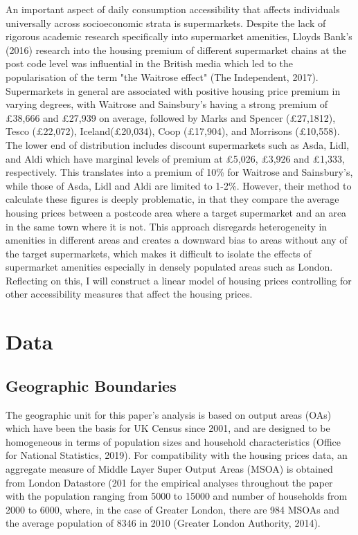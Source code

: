 \documentclass{article}
\begin{document}
An important aspect of daily consumption accessibility that affects individuals universally across socioeconomic strata is supermarkets. Despite the lack of rigorous academic research specifically into supermarket amenities, Lloyds Bank's (2016) research into the housing premium of different supermarket chains at the post code level was influential in the British media which led to the popularisation of the term "the Waitrose effect" (The Independent, 2017). Supermarkets in general are associated with positive housing price premium in varying degrees, with Waitrose and Sainsbury's having a strong premium of £38,666 and £27,939 on average, followed by Marks and Spencer (£27,1812), Tesco (£22,072), Iceland(£20,034), Coop (£17,904), and Morrisons (£10,558). The lower end of distribution includes discount supermarkets such as Asda, Lidl, and Aldi which have marginal levels of premium at £5,026, £3,926 and £1,333, respectively. This translates into a premium of 10\% for Waitrose and Sainsbury's, while those of Asda, Lidl and Aldi are limited to 1-2\%. However, their method to calculate these figures is deeply problematic, in that they compare the average housing prices between a postcode area where a target supermarket and an area in the same town where it is not. This approach disregards heterogeneity in amenities in different areas and creates a downward bias to areas without any of the target supermarkets, which makes it difficult to isolate the effects of supermarket amenities especially in densely populated areas such as London. Reflecting on this, I will construct a linear model of housing prices controlling for other accessibility measures that affect the housing prices. 


\section{Data} \label{section:data}
\subsection{Geographic Boundaries}
The geographic unit for this paper's analysis is based on output areas (OAs) which have been the basis for UK Census since 2001, and are designed to be homogeneous in terms of population sizes and household characteristics (Office for National Statistics, 2019). For compatibility with the housing prices data, an aggregate measure of Middle Layer Super Output Areas (MSOA) is obtained from London Datastore (201 for the empirical analyses throughout the paper with the population ranging from 5000 to 15000 and number of households from 2000 to 6000, where, in the case of Greater London, there are 984 MSOAs and the average population of 8346 in 2010 (Greater London Authority, 2014).
\end{document}
